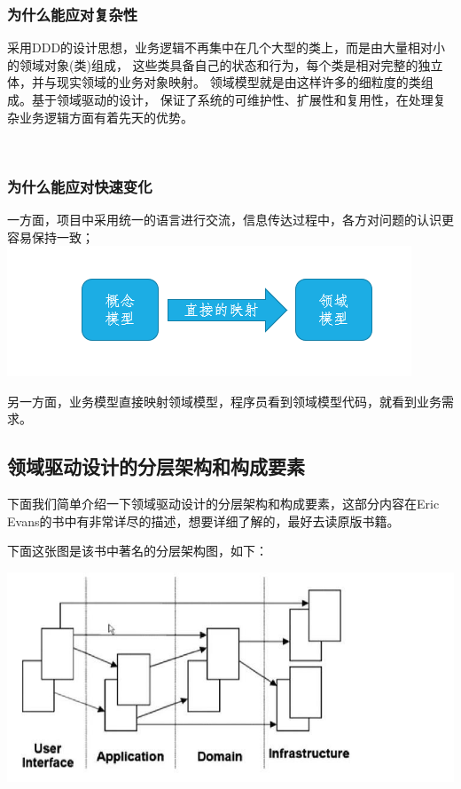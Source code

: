 \documentclass[journal]{IEEEtran}
\begin{document}
\begin{CJK*}{UTF8}{gbsn}
\subsubsection{为什么能应对复杂性}
采用DDD的设计思想，业务逻辑不再集中在几个大型的类上，而是由大量相对小的领域对象(类)组成，
这些类具备自己的状态和行为，每个类是相对完整的独立体，并与现实领域的业务对象映射。
领域模型就是由这样许多的细粒度的类组成。基于领域驱动的设计，
保证了系统的可维护性、扩展性和复用性，在处理复杂业务逻辑方面有着先天的优势。

\\
\subsubsection{为什么能应对快速变化}
一方面，项目中采用统一的语言进行交流，信息传达过程中，各方对问题的认识更容易保持一致；
\includegraphics[scale=0.4]{1.png}

另一方面，业务模型直接映射领域模型，程序员看到领域模型代码，就看到业务需求。

\subsection{领域驱动设计的分层架构和构成要素}

下面我们简单介绍一下领域驱动设计的分层架构和构成要素，这部分内容在Eric Evans的书中有非常详尽的描述，想要详细了解的，最好去读原版书籍。

下面这张图是该书中著名的分层架构图，如下：

\includegraphics[scale=0.4]{3.jpeg}
\\


\end{CJK*}
\end{document}
